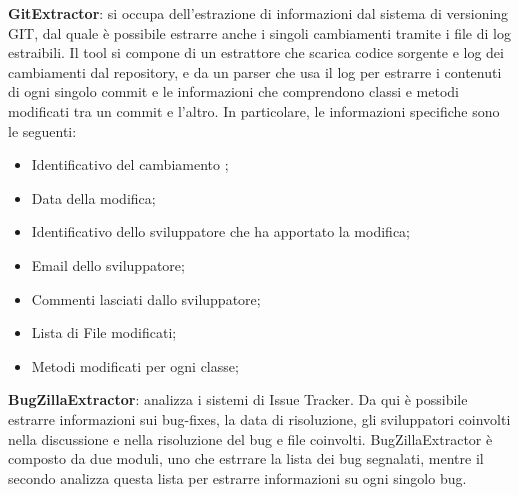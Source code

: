 \textbf{GitExtractor}: si occupa dell'estrazione di informazioni dal sistema di versioning GIT, dal quale è possibile estrarre anche i singoli cambiamenti tramite i file di log estraibili. Il tool si compone di un estrattore che scarica codice sorgente e log dei cambiamenti dal repository, e da un parser che usa il log per estrarre i contenuti di ogni singolo commit e le informazioni che comprendono classi e metodi modificati tra un commit e l'altro. In particolare, le informazioni specifiche sono le seguenti:
\begin{itemize}
\item Identificativo del cambiamento ;
\item Data della modifica;
\item Identificativo dello sviluppatore che ha apportato la modifica;
\item Email dello sviluppatore;
\item Commenti lasciati dallo sviluppatore;
\item Lista di File modificati;
\item Metodi modificati per ogni classe;
\end{itemize}

\textbf{BugZillaExtractor}: analizza i sistemi di Issue Tracker. Da qui è possibile estrarre informazioni sui bug-fixes, la data di risoluzione, gli sviluppatori coinvolti nella discussione e nella risoluzione del bug e file coinvolti. BugZillaExtractor è composto da due moduli, uno che estrrare la lista dei bug segnalati, mentre il secondo analizza questa lista per estrarre informazioni su ogni singolo bug.